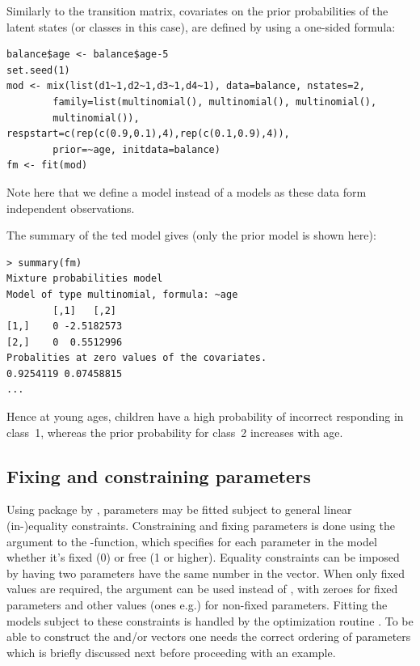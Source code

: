 \documentclass[article]{jss}
\begin{document}
Similarly to the transition matrix, covariates on the prior 
probabilities of the latent states (or classes in this case), are 
defined by using a one-sided formula: 
\begin{verbatim}
balance$age <- balance$age-5
set.seed(1)
mod <- mix(list(d1~1,d2~1,d3~1,d4~1), data=balance, nstates=2,
        family=list(multinomial(), multinomial(), multinomial(),
		multinomial()), respstart=c(rep(c(0.9,0.1),4),rep(c(0.1,0.9),4)), 
		prior=~age, initdata=balance)
fm <- fit(mod)
\end{verbatim}
Note here that we define a  model instead of a 
models as these data form independent observations.

The summary of the ted model gives (only the prior model is 
shown here): 
\begin{verbatim}
> summary(fm)
Mixture probabilities model 
Model of type multinomial, formula: ~age
		[,1]   [,2]
[1,]    0 -2.5182573
[2,]    0  0.5512996
Probalities at zero values of the covariates.
0.9254119 0.07458815 
...
\end{verbatim}	
Hence at young ages, children have a high probability of incorrect 
responding in class~1, whereas the prior probability for class~2 
increases with age. 


\subsection{Fixing and constraining parameters}

Using package  by \citet{Tamura2009}, parameters may be fitted subject to
general linear (in-)equality constraints.  Constraining and fixing
parameters is done using the  argument to the
-function, which specifies for each parameter in the
model whether it's fixed (0) or free (1 or higher).  Equality
constraints can be imposed by having two parameters have the same
number in the  vector.  When only fixed values are
required, the  argument can be used instead of
, with zeroes for fixed parameters and other values (ones
e.g.) for non-fixed parameters.  Fitting the models subject to these
constraints is handled by the optimization routine .
To be able to construct the  and/or  vectors 
one needs the correct ordering of parameters which is briefly discussed 
next before proceeding with an example. 
\end{document}
